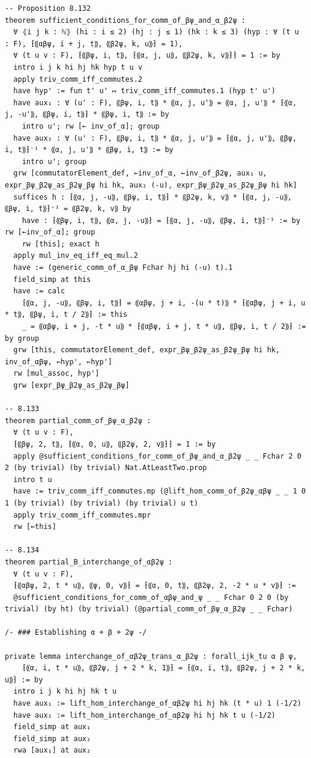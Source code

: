 \documentclass[10pt,a4paper]{article}
\begin{document}
\begin{Verbatim}
-- Proposition 8.132
theorem sufficient_conditions_for_comm_of_βψ_and_α_β2ψ :
  ∀ ⦃i j k : ℕ⦄ (hi : i ≤ 2) (hj : j ≤ 1) (hk : k ≤ 3) (hyp : ∀ (t u : F), ⁅⸨αβψ, i + j, t⸩, ⸨β2ψ, k, u⸩⁆ = 1),
  ∀ (t u v : F), ⁅⸨βψ, i, t⸩, ⁅⸨α, j, u⸩, ⸨β2ψ, k, v⸩⁆⁆ = 1 := by
  intro i j k hi hj hk hyp t u v
  apply triv_comm_iff_commutes.2
  have hyp' := fun t' u' ↦ triv_comm_iff_commutes.1 (hyp t' u')
  have aux₁ : ∀ (u' : F), ⸨βψ, i, t⸩ * ⸨α, j, u'⸩ = ⸨α, j, u'⸩ * ⁅⸨α, j, -u'⸩, ⸨βψ, i, t⸩⁆ * ⸨βψ, i, t⸩ := by
    intro u'; rw [← inv_of_α]; group
  have aux₂ : ∀ (u' : F), ⸨βψ, i, t⸩ * ⸨α, j, u'⸩ = ⁅⸨α, j, u'⸩, ⸨βψ, i, t⸩⁆⁻¹ * ⸨α, j, u'⸩ * ⸨βψ, i, t⸩ := by
    intro u'; group
  grw [commutatorElement_def, ←inv_of_α, ←inv_of_β2ψ, aux₁ u, expr_βψ_β2ψ_as_β2ψ_βψ hi hk, aux₂ (-u), expr_βψ_β2ψ_as_β2ψ_βψ hi hk]
  suffices h : ⁅⸨α, j, -u⸩, ⸨βψ, i, t⸩⁆ * ⸨β2ψ, k, v⸩ * ⁅⸨α, j, -u⸩, ⸨βψ, i, t⸩⁆⁻¹ = ⸨β2ψ, k, v⸩ by
    have : ⁅⸨βψ, i, t⸩, ⸨α, j, -u⸩⁆ = ⁅⸨α, j, -u⸩, ⸨βψ, i, t⸩⁆⁻¹ := by rw [←inv_of_α]; group
    rw [this]; exact h
  apply mul_inv_eq_iff_eq_mul.2
  have := (generic_comm_of_α_βψ Fchar hj hi (-u) t).1
  field_simp at this
  have := calc
    ⁅⸨α, j, -u⸩, ⸨βψ, i, t⸩⁆ = ⸨αβψ, j + i, -(u * t)⸩ * ⁅⸨αβψ, j + i, u * t⸩, ⸨βψ, i, t / 2⸩⁆ := this
    _ = ⸨αβψ, i + j, -t * u⸩ * ⁅⸨αβψ, i + j, t * u⸩, ⸨βψ, i, t / 2⸩⁆ := by group
  grw [this, commutatorElement_def, expr_βψ_β2ψ_as_β2ψ_βψ hi hk, inv_of_αβψ, ←hyp', ←hyp']
  rw [mul_assoc, hyp']
  grw [expr_βψ_β2ψ_as_β2ψ_βψ]

-- 8.133
theorem partial_comm_of_βψ_α_β2ψ :
  ∀ (t u v : F),
  ⁅⸨βψ, 2, t⸩, ⁅⸨α, 0, u⸩, ⸨β2ψ, 2, v⸩⁆⁆ = 1 := by
  apply @sufficient_conditions_for_comm_of_βψ_and_α_β2ψ _ _ Fchar 2 0 2 (by trivial) (by trivial) Nat.AtLeastTwo.prop
  intro t u
  have := triv_comm_iff_commutes.mp (@lift_hom_comm_of_β2ψ_αβψ _ _ 1 0 1 (by trivial) (by trivial) (by trivial) u t)
  apply triv_comm_iff_commutes.mpr
  rw [←this]

-- 8.134
theorem partial_B_interchange_of_αβ2ψ :
  ∀ (t u v : F),
  ⁅⸨αβψ, 2, t * u⸩, ⸨ψ, 0, v⸩⁆ = ⁅⸨α, 0, t⸩, ⸨β2ψ, 2, -2 * u * v⸩⁆ :=
  @sufficient_conditions_for_comm_of_αβψ_and_ψ _ _ Fchar 0 2 0 (by trivial) (by ht) (by trivial) (@partial_comm_of_βψ_α_β2ψ _ _ Fchar)

/- ### Establishing α + β + 2ψ -/

private lemma interchange_of_αβ2ψ_trans_α_β2ψ : forall_ijk_tu α β ψ,
    ⁅⸨α, i, t * u⸩, ⸨β2ψ, j + 2 * k, 1⸩⁆ = ⁅⸨α, i, t⸩, ⸨β2ψ, j + 2 * k, u⸩⁆ := by
  intro i j k hi hj hk t u
  have aux₁ := lift_hom_interchange_of_αβ2ψ hi hj hk (t * u) 1 (-1/2)
  have aux₂ := lift_hom_interchange_of_αβ2ψ hi hj hk t u (-1/2)
  field_simp at aux₁
  field_simp at aux₂
  rwa [aux₁] at aux₂


\end{Verbatim}
\end{document}
